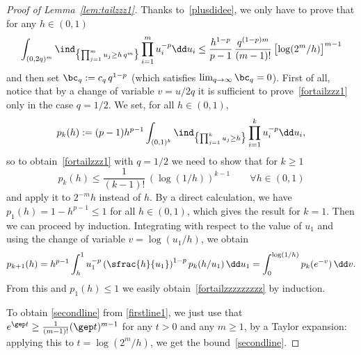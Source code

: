 \begin{proof}[Proof of Lemma~\ref{lem:tailzzz1}]
Thanks to~\eqref{plusdidee},
we only have to prove that for any \hbox{$h\!\in\!(0,1)$}%
\begin{equation}
\label{fortailzzz1}
\int_{(0,2q)^m} \ind_{\bigl\{\prod^m_{j=1}u_j \ge h\, q^m\bigr\}} \prod_{i=1}^m u_i^{-p} \dd u_i
\leq \frac{h^{1-p}}{p-1}\,
\frac{ q^{(1-p)m} }{(m-1)!}\, \bigl[ \log (2^m/h)\bigr]^{m-1}
\end{equation}
and then set $\bc_q := c_q \, q^{1-p}$ (which satisfies $\lim_{q\to \infty} \bc_q =0$).
First of all, notice that by a change of variable $v=u/2q$ it is sufficient to prove~\eqref{fortailzzz1} only in the case $q=1/2$.
We set, for all $h\in (0,1)$,
\[
p_k(h):= (p-1) h^{p-1} \int_{(0,1)^k}
\ind_{\bigl\{ \prod^k_{j=1}u_j \ge h\bigr\}} \prod_{i=1}^k u^{-p}_i \dd u_i,
\]
so to obtain~\eqref{fortailzzz1} with $q=1/2$ we need to show that for $k\geq 1$
\begin{equation}
\label{fortailzzzzzzzzz}
p_k(h)\le \frac{1}{(k-1)!}\,(\log (1/h))^{k-1} \qquad \forall h \in (0,1)
\end{equation}
and apply it to $2^{-m}h$ instead of $h$.
By a direct calculation, we have \hbox{$p_1(h) \!=\! 1-h^{p-1} \!\leq\! 1$} for all $h\in(0,1)$, which gives the result for $k=1$.
Then we can proceed by induction. Integrating with respect to the value of $u_1$ and using the change of variable $v=\log(u_1/h)$, we obtain
\begin{equation*}
p_{k+1}(h)= h^{p-1}\int_{h}^1 u_1^{-p} \left(\sfrac{h}{u_1}\right)^{1-p} p_{k}(h/u_1) \,\dd u_1
= \int_{0}^{\log (1/h)} p_{k}(e^{-v}) \,\dd v.
\end{equation*}
From this and $p_1(h)\le 1$ we easily obtain~\eqref{fortailzzzzzzzzz} by induction.

To obtain \eqref{secondline} from \eqref{firstline1},
we just use that $e^{\gep t} \geq \frac{1}{(m-1)!} (\gep t)^{m-1}$ for any $t>0$ and any $m\geq 1$, by a Taylor expansion: applying this to $t= \log(2^m/h)$, we get the bound~\eqref{secondline}.
\end{proof}

